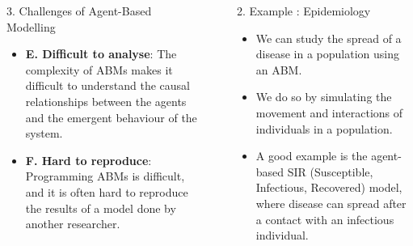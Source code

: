 \documentclass[final,hyperref={pdfpagelabels=false}]{beamer}
\newcommand{\shrink}{-15pt}
\begin{document}
\begin{frame}[t]
\begin{columns}[t]
\begin{column}{.48\textwidth}
\begin{block}{3. Challenges of Agent-Based Modelling}
\begin{itemize}
        \item\justifying \textbf{E. Difficult to analyse}: The complexity of ABMs makes it difficult to understand the causal 
          relationships between the agents and the emergent behaviour of the system.
        \item\justifying \textbf{F. Hard to reproduce}: Programming ABMs is difficult, and it is often hard to 
          reproduce the results of a model done by another researcher.
      \end{itemize}
    \end{block}

  \end{column} %


  \begin{column}{.02\textwidth}\end{column} %

  \begin{column}{.48\textwidth} %
    \vspace{\shrink}
    \begin{block}{2. Example : Epidemiology}
      \begin{itemize}
        \item We can study the spread of a disease in a population using an ABM.
        \item We do so by simulating the movement and interactions of individuals in a population.
        \item A good example is the agent-based SIR (Susceptible, Infectious, Recovered) model, where disease can spread after a contact with an infectious individual.
        \vspace{1cm}
          \begin{figure}
            \captionsetup[subfigure]{justification=centering}
            \begin{subfigure}[t]{0.3 \columnwidth}
\end{subfigure}
\end{figure}
\end{itemize}
\end{block}
\end{column}
\end{columns}
\end{frame}
\end{document}
